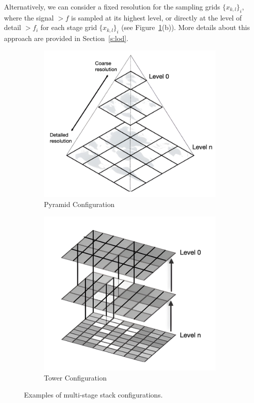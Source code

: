 Alternatively, we can consider a fixed resolution for the sampling grids \(\{x_{k,l}\}_i\), where the signal \(\gt{f}\) is sampled at its highest level, or directly at the level of detail \(\gt{f}_i\) for each stage grid \(\{x_{k,l}\}_i\) (see Figure~\ref{f:multi}(b)). More details about this approach are provided in Section~\ref{s:lod}.

\begin{figure}[!h]
\centering
\begin{subfigure}{0.45\linewidth}
\includegraphics[width=\linewidth]{img/ch4/pyramid.png}
\caption{Pyramid Configuration}
\end{subfigure}
\begin{subfigure}{0.45\linewidth}
\includegraphics[width=\linewidth]{img/ch4/tower.png}    
\caption{Tower Configuration}
\end{subfigure}
\caption{Examples of multi-stage stack configurations.}
\label{f:multi}
\end{figure}

